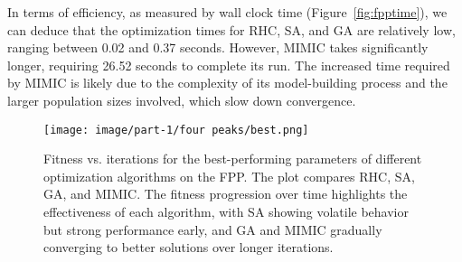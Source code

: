 In terms of efficiency, as measured by wall clock time (Figure~\ref{fig:fpptime}), we can deduce that the optimization times for RHC, SA, and GA are relatively low, ranging between 0.02 and 0.37 seconds. However, MIMIC takes significantly longer, requiring 26.52 seconds to complete its run. The increased time required by MIMIC is likely due to the complexity of its model-building process and the larger population sizes involved, which slow down convergence.
\begin{figure}[htbp]
\centerline{\texttt{[image: image/part-1/four peaks/best.png]}}
\caption{Fitness vs. iterations for the best-performing parameters of different optimization algorithms on the FPP. The plot compares RHC, SA, GA, and MIMIC. The fitness progression over time highlights the effectiveness of each algorithm, with SA showing volatile behavior but strong performance early, and GA and MIMIC gradually converging to better solutions over longer iterations.}
\label{fig:fppbest}
\end{figure}

